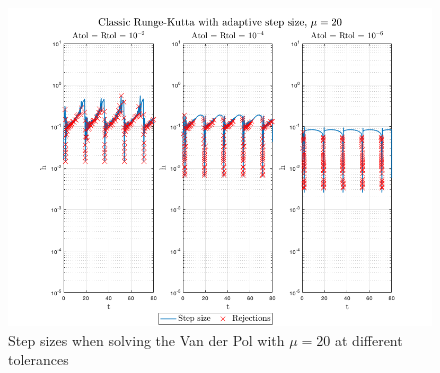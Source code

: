 \begin{figure}[H]
    \centering
    \includegraphics[width=\textwidth]{graphics/opg5/mu20_h.png}
    \caption{Step sizes when solving the Van der Pol with $\mu = 20$ at different tolerances}
    \label{fig5:adap_mu20_h}
\end{figure}






